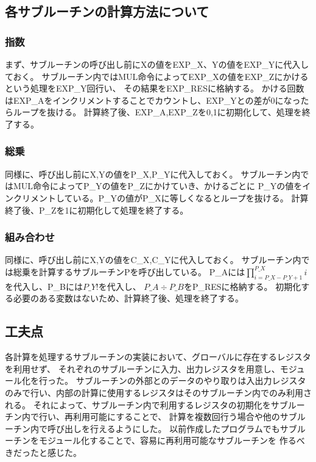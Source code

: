 \documentclass{jsarticle}
\begin{document}
\newpage

\subsection*{各サブルーチンの計算方法について}

\subsubsection*{指数}
まず、サブルーチンの呼び出し前にXの値をEXP\_X、Yの値をEXP\_Yに代入しておく。
サブルーチン内ではMUL命令によってEXP\_Xの値をEXP\_Zにかけるという処理をEXP\_Y回行い、
その結果をEXP\_RESに格納する。
かける回数はEXP\_Aをインクリメントすることでカウントし、EXP\_Yとの差が0になったらループを抜ける。
計算終了後、EXP\_A,EXP\_Zを0,1に初期化して、処理を終了する。

\subsubsection*{総乗}
同様に、呼び出し前にX,Yの値をP\_X,P\_Yに代入しておく。
サブルーチン内ではMUL命令によってP\_Yの値をP\_Zにかけていき、かけるごとに
P\_Yの値をインクリメントしている。P\_Yの値がP\_Xに等しくなるとループを抜ける。
計算終了後、P\_Zを1に初期化して処理を終了する。

\subsubsection*{組み合わせ}
同様に、呼び出し前にX,Yの値をC\_X,C\_Yに代入しておく。
サブルーチン内では総乗を計算するサブルーチンPを呼び出している。
P\_Aには$\prod_{i=P\_X-P\_Y+1}^{P\_X} i$を代入し、P\_Bには$P\_Y!$を代入し、
${P\_A}\div{P\_B}$をP\_RESに格納する。
初期化する必要のある変数はないため、計算終了後、処理を終了する。

\subsection*{工夫点}

各計算を処理するサブルーチンの実装において、グローバルに存在するレジスタを利用せず、
それぞれのサブルーチンに入力、出力レジスタを用意し、モジュール化を行った。
サブルーチンの外部とのデータのやり取りは入出力レジスタのみで行い、内部の計算に使用するレジスタはそのサブルーチン内でのみ利用される。
それによって、サブルーチン内で利用するレジスタの初期化をサブルーチン内で行い、再利用可能にすることで、
計算を複数回行う場合や他のサブルーチン内で呼び出しを行えるようにした。
以前作成したプログラムでもサブルーチンをモジュール化することで、容易に再利用可能なサブルーチンを
作るべきだったと感じた。\\
\\
\end{document}

